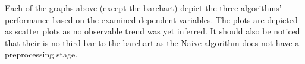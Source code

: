 \documentclass[12pt]{article}
\begin{document}

Each of the graphs above (except the barchart) depict the three algorithms' performance based on the examined dependent variables.
The plots are depicted as scatter plots as no observable trend was yet inferred. It should also be noticed that their is no third bar to the barchart as the Naive algorithm does not have a preprocessing stage.
\end{document}
